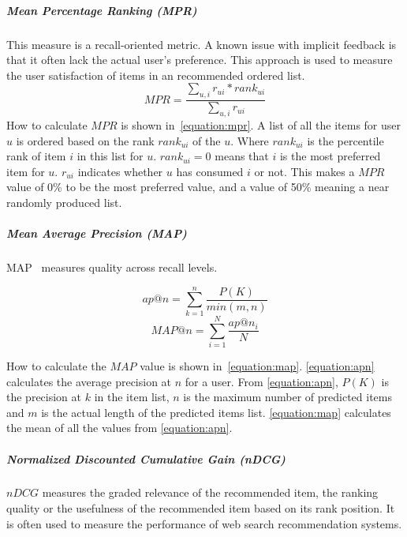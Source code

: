\label{par:accuracy_ranking}


\subparagraph{Mean Percentage Ranking (MPR)}
\label{subp:mean_percentage_ranking_}
This measure is a recall-oriented metric.
A known issue with implicit feedback is that it often lack the actual user's preference.
This approach is used to measure the user satisfaction of items in an recommended ordered list.
\begin{equation}
	MPR = \frac{\sum_{u,i}{r_{ui} * rank_{ui}}}{\sum_{u,i}{r_{ui}}}
	\label{equation:mpr}
\end{equation}
How to calculate $MPR$ is shown in~\ref{equation:mpr}.
A list of all the items for user $u$ is ordered based on the rank $rank_{ui}$ of the $u$.
Where $rank_{ui}$ is the percentile rank of item $i$ in this list for $u$.
$rank_{ui} = 0$ means that $i$ is the most preferred item for $u$.
$r_{ui}$ indicates whether $u$ has consumed $i$ or not.
This makes a $MPR$ value of 0\% to be the most preferred value, and a value of 50\% meaning a near randomly produced list.

\subparagraph{Mean Average Precision (MAP)}

\label{subp:mean_average_precision_map_}
MAP~\cite{Manning:2008:IIR:1394399} measures quality across recall levels.

\begin{equation}
	ap@n = \sum_{k=1}^{n}{\frac{P(K)}{min(m,n)}}
	\label{equation:apn}
\end{equation}
\begin{equation}
	MAP@n = \sum_{i=1}^{N}{\frac{ap@n_i}{N}}
	\label{equation:map}
\end{equation}

How to calculate the $MAP$ value is shown in~\ref{equation:map}.
\ref{equation:apn} calculates the average precision at $n$ for a user.
From \ref{equation:apn}, $P(K)$ is the precision at $k$ in the item list, $n$ is the maximum number of predicted items and $m$ is the actual length of the predicted items list.
\ref{equation:map} calculates the mean of all the values from \ref{equation:apn}.

\subparagraph{Normalized Discounted Cumulative Gain (nDCG)}
\label{subp:normalized_discounted_cumulative_gain_}

$nDCG$ measures the graded relevance of the recommended item, the ranking quality or the usefulness of the recommended item based on its rank position.
It is often used to measure the performance of web search recommendation systems.

